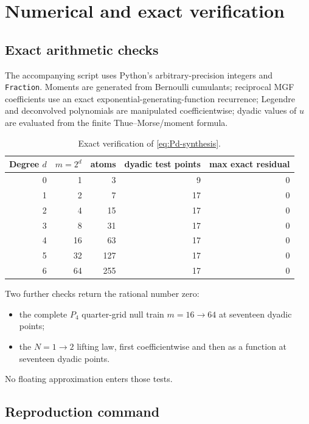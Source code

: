 \documentclass[11pt,oneside]{article}
\numberwithin{equation}{section}
\theoremstyle{definition}
\theoremstyle{remark}
\begin{document}
\section{Numerical and exact verification}
\label{sec:verification}

\subsection{Exact arithmetic checks}

The accompanying script uses Python's arbitrary-precision integers and
\texttt{Fraction}.  Moments are generated from Bernoulli cumulants; reciprocal
MGF coefficients use an exact exponential-generating-function recurrence;
Legendre and deconvolved polynomials are manipulated coefficientwise; dyadic
values of $u$ are evaluated from the finite Thue--Morse/moment formula.

\begin{table}[H]
\centering
\small
\begin{tabular}{@{}rrrrr@{}}
\toprule
Degree $d$ & $m=2^d$ & atoms & dyadic test points & max exact residual\\
\midrule
0 & 1 & 3 & 9 & $0$\\
1 & 2 & 7 & 17 & $0$\\
2 & 4 & 15 & 17 & $0$\\
3 & 8 & 31 & 17 & $0$\\
4 & 16 & 63 & 17 & $0$\\
5 & 32 & 127 & 17 & $0$\\
6 & 64 & 255 & 17 & $0$\\
\bottomrule
\end{tabular}
\caption{Exact verification of \eqref{eq:Pd-synthesis}.}
\label{tab:exact-checks}
\end{table}

Two further checks return the rational number zero:
\begin{itemize}
 \item the complete $P_4$ quarter-grid null train $m=16\to64$ at seventeen
 dyadic points;
 \item the $N=1\to2$ lifting law, first coefficientwise and then as a function
 at seventeen dyadic points.
\end{itemize}
No floating approximation enters those tests.

\subsection{Reproduction command}
\end{document}
